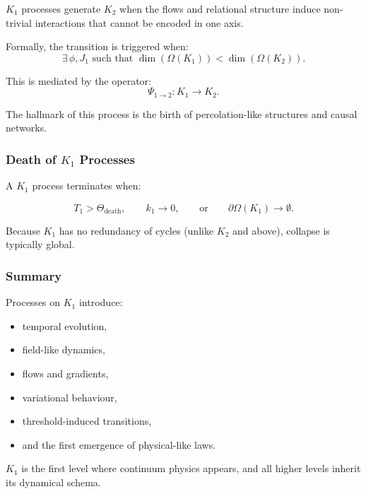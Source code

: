 $K_1$ processes generate $K_2$ when the flows and relational structure
induce non-trivial interactions that cannot be encoded in one axis.

Formally, the transition is triggered when:
\[
\exists\, \phi, J_1 \text{ such that }
\dim(\Omega(K_1)) < \dim(\Omega(K_2)).
\]

This is mediated by the operator:
\[
\Psi_{1\to2}: K_1 \to K_2.
\]

The hallmark of this process is the birth of percolation-like structures
and causal networks.

\subsubsection{Death of \texorpdfstring{$K_1$}{K_1} Processes}

A $K_1$ process terminates when:

\[
T_1 > \Theta_{\mathrm{death}},
\qquad
k_1 \to 0,
\qquad
\text{or}
\qquad
\partial\Omega(K_1) \to \emptyset.
\]

Because $K_1$ has no redundancy of cycles (unlike $K_2$ and above),
collapse is typically global.

\subsubsection{Summary}

Processes on $K_1$ introduce:

\begin{itemize}
    \item temporal evolution,
    \item field-like dynamics,
    \item flows and gradients,
    \item variational behaviour,
    \item threshold-induced transitions,
    \item and the first emergence of physical-like laws.
\end{itemize}

$K_1$ is the first level where continuum physics appears, and all higher
levels inherit its dynamical schema.
